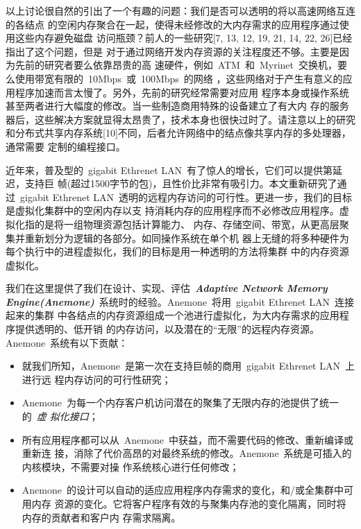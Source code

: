 \documentclass[dvipdfm, NoBUAAtitle]{BUAApaper}
\begin{document}
以上讨论很自然的引出了一个有趣的问题：我们是否可以透明的将以高速网络互连的各结点
的空闲内存聚合在一起，使得未经修改的大内存需求的应用程序通过使用这些内存避免磁盘
访问瓶颈？前人的一些研究[7, 13, 12, 19, 21, 14, 22, 26]已经指出了这个问题，但是
对于通过网络开发内存资源的关注程度还不够。主要是因为先前的研究者要么依靠昂贵的高
速硬件，例如~ATM~和~Myrinet~交换机，要么使用带宽有限的~10Mbps~或~100Mbps~的网络
，这些网络对于产生有意义的应用程序加速而言太慢了。另外，先前的研究经常需要对应用
程序本身或操作系统甚至两者进行大幅度的修改。当一些制造商用特殊的设备建立了有大内
存的服务器后，这些解决方案就显得太昂贵了，技术本身也很快过时了。请注意以上的研究
和分布式共享内存系统[10]不同，后者允许网络中的结点像共享内存的多处理器，通常需要
定制的编程接口。

近年来，普及型的~gigabit Ethrenet LAN~有了惊人的增长，它们可以提供第延迟，支持巨
帧(超过1500字节的包)，且性价比非常有吸引力。本文重新研究了通过~gigabit Ethrenet
LAN~透明的远程内存访问的可行性。更进一步，我们的目标是虚拟化集群中的空闲内存以支
持消耗内存的应用程序而不必修改应用程序。虚拟化指的是将一组物理资源包括计算能力、
内存、存储空间、带宽，从更高层聚集并重新划分为逻辑的各部分。如同操作系统在单个机
器上无缝的将多种硬件为每个执行中的进程虚拟化，我们的目标是用一种透明的方法将集群
中的内存资源虚拟化。

我们在这里提供了我们在设计、实现、评估~{\bf\slshape Adaptive Network Memory
Engine(Anemone)}~系统时的经验。Anemone~将用~gigabit Ethrenet LAN~连接起来的集群
中各结点的内存资源组成一个池进行虚拟化，为大内存需求的应用程序提供透明的、低开销
的内存访问，以及潜在的``无限''的远程内存资源。Anemone~系统有以下贡献：

\begin{itemize}

\item 就我们所知，Anemone~是第一次在支持巨帧的商用~gigabit Ethrenet LAN~上进行远
程内存访问的可行性研究；

\item Anemone~为每一个内存客户机访问潜在的聚集了无限内存的池提供了统一的~{\em 虚
	拟化接口}；

\item 所有应用程序都可以从~Anemone~中获益，而不需要代码的修改、重新编译或重新连
接，消除了代价高昂的对最终系统的修改。Anemone~系统是可插入的内核模块，不需要对操
作系统核心进行任何修改；

\item Anemone~的设计可以自动的适应应用程序内存需求的变化，和/或全集群中可用内存
资源的变化。它将客户程序有效的与聚集内存池的变化隔离，同时将内存的贡献者和客户内
存需求隔离。

\end{itemize}
\end{document}
